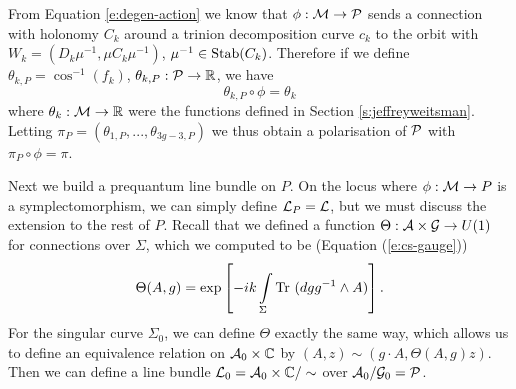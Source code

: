	From Equation \ref{e:degen-action} we know that $\phi:\mathcal{M}\to\mathcal{P}$ sends a connection with holonomy $C_k$ around a trinion decomposition curve $c_k$ to the orbit with $W_k = (D_k\mu^{-1}, \mu C_k\mu^{-1})$, $\mu^{-1}\in\text{Stab}(C_k)$. Therefore if we define $\theta_{k,P} = \cos^{-1}(f_k)$, $\theta_{k,P}:\mathcal{P} \to \mathbb{R}$, we have
	\begin{equation}
		\theta_{k,P} \circ \phi = \theta_k
	\end{equation}
	where $\theta_k:\mathcal{M}\to\mathbb{R}$ were the functions defined in Section \ref{s:jeffreyweitsman}. Letting $\pi_P = (\theta_{1,P},...,\theta_{3g-3,P})$ we thus obtain a polarisation of $\mathcal{P}$ with $\pi_P\circ \phi = \pi$.
	
	Next we build a prequantum line bundle on $P$. On the locus where $\phi:\mathcal{M}\to P$ is a symplectomorphism, we can simply define $\mathcal{L}_P = \mathcal{L}$, but we must discuss the extension to the rest of $P$. Recall that we defined a function $\Theta:\mathcal{A}\times\mathcal{G}\to U(1)$ for connections over $\Sigma$, which we computed to be (Equation (\ref{e:cs-gauge})) 
	\begin{equation}
	\Theta(A,g) = \exp\left[-ik\int\limits_\Sigma \text{Tr }(dg g^{-1}\wedge A)\right].
	\end{equation}
	For the singular curve $\Sigma_0$, we can define $\Theta$ exactly the same way, which allows us to define an equivalence relation on $\mathcal{A}_0\times \mathbb{C}$ by $(A,z)\sim (g\cdot A, \Theta(A,g)z)$. Then we can define a line bundle $\mathcal{L}_0 = \mathcal{A}_0 \times \mathbb{C}/\sim$ over $\mathcal{A}_0/\mathcal{G}_0 = \mathcal{P}$.	
	
